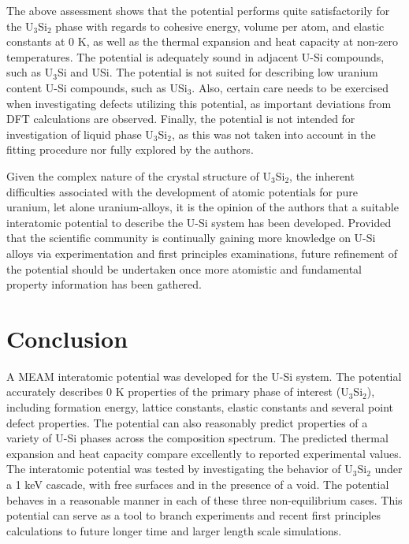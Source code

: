 \documentclass[review]{elsarticle}
\begin{document}
The above assessment shows that the potential performs quite satisfactorily for the U$_{3}$Si$_{2}$ phase with regards to cohesive energy, volume per atom, and elastic constants at 0 K, as well as the thermal expansion and heat capacity at non-zero temperatures.  The potential is adequately sound in adjacent U-Si compounds, such as U$_{3}$Si and USi.  The potential is not suited for describing low uranium content U-Si compounds, such as USi$_{3}$.  Also, certain care needs to be exercised when investigating defects utilizing this potential, as important deviations from DFT calculations are observed.  Finally, the potential is not intended for investigation of liquid phase U$_{3}$Si$_{2}$, as this was not taken into account in the fitting procedure nor fully explored by the authors.  

Given the complex nature of the crystal structure of U$_{3}$Si$_{2}$, the inherent difficulties associated with the development of atomic potentials for pure uranium, let alone uranium-alloys, it is the opinion of the authors that a suitable interatomic potential to describe the U-Si system has been developed.  Provided that the scientific community is continually gaining more knowledge on U-Si alloys via experimentation and first principles examinations, future refinement of the potential should be undertaken once more atomistic and fundamental property information has been gathered.  

\section{Conclusion}

A MEAM interatomic potential was developed for the U-Si system.  The potential accurately describes 0 K properties of the primary phase of interest (U$_{3}$Si$_{2}$), including formation energy, lattice constants, elastic constants and several point defect properties.  The potential can also reasonably predict properties of a variety of U-Si phases across the composition spectrum.  The predicted thermal expansion and heat capacity compare excellently to reported experimental values.  The interatomic potential was tested by investigating the behavior of U$_{3}$Si$_{2}$ under a 1 keV cascade, with free surfaces and in the presence of a void.  The potential behaves in a reasonable manner in each of these three non-equilibrium cases.  This potential can serve as a tool to branch experiments and recent first principles calculations to future longer time and larger length scale simulations.  
\end{document}
